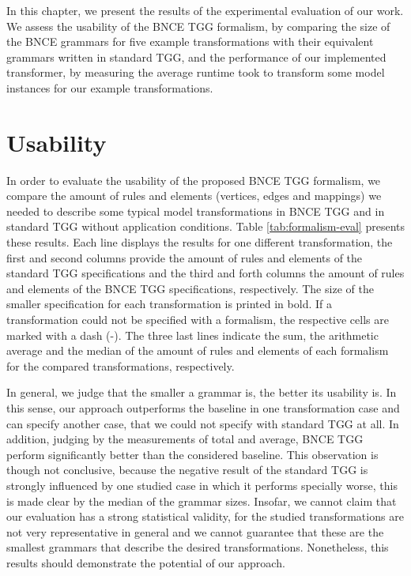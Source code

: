 In this chapter, we present the results of the experimental evaluation of our work. We assess the usability of the BNCE TGG formalism, by comparing the size of the BNCE grammars for five example transformations with their equivalent grammars written in standard TGG, and the performance of our implemented transformer, by measuring the average runtime took to transform some model instances for our example transformations.

\section{Usability}
\label{sec:eval-usability}
In order to evaluate the usability of the proposed BNCE TGG formalism, we compare the amount of rules and elements (vertices, edges and mappings) we needed to describe some typical model transformations in BNCE TGG and in standard TGG without application conditions. Table \ref{tab:formalism-eval} presents these results. Each line displays the results for one different transformation, the first and second columns provide the amount of rules and elements of the standard TGG specifications and the third and forth columns the amount of rules and elements of the BNCE TGG specifications, respectively. The size of the smaller specification for each transformation is printed in bold. If a transformation could not be specified with a formalism, the respective cells are marked with a dash (-). The three last lines indicate the sum, the arithmetic average and the median of the amount of rules and elements of each formalism for the compared transformations, respectively.

In general, we judge that the smaller a grammar is, the better its usability is. In this sense, our approach outperforms the baseline in one transformation case and can specify another case, that we could not specify with standard TGG at all. In addition, judging by the measurements of total and average, BNCE TGG perform significantly better than the considered baseline. This observation is though not conclusive, because the negative result of the standard TGG is strongly influenced by one studied case in which it performs specially worse, this is made clear by the median of the grammar sizes. Insofar, we cannot claim that our evaluation has a strong statistical validity, for the studied transformations are not very representative in general and we cannot guarantee that these are the smallest grammars that describe the desired transformations. Nonetheless, this results should demonstrate the potential of our approach.


